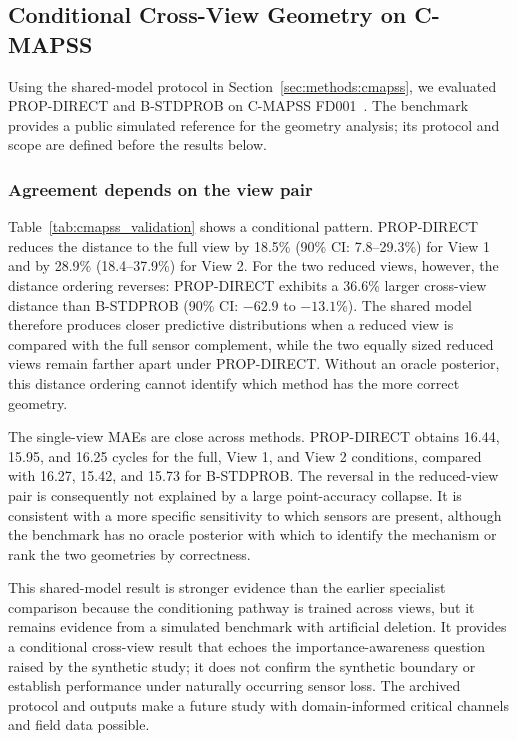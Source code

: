 \subsection{Conditional Cross-View Geometry on C-MAPSS}
\label{sec:results_cmapss}

Using the shared-model protocol in Section~\ref{sec:methods:cmapss}, we evaluated
PROP-DIRECT and B-STDPROB on C-MAPSS FD001~\citep{saxena2008cmapss}. The benchmark
provides a public simulated reference for the geometry analysis; its protocol and
scope are defined before the results below.

\subsubsection{Agreement depends on the view pair}

Table~\ref{tab:cmapss_validation} shows a conditional pattern. PROP-DIRECT reduces the distance to the full view by 18.5\% (90\% CI: 7.8--29.3\%) for View 1 and by 28.9\% (18.4--37.9\%) for View 2. For the two reduced views, however, the distance ordering reverses: PROP-DIRECT exhibits a 36.6\% larger cross-view distance than B-STDPROB (90\% CI: $-62.9$ to $-13.1$\%). The shared model therefore produces closer predictive distributions when a reduced view is compared with the full sensor complement, while the two equally sized reduced views remain farther apart under PROP-DIRECT. Without an oracle posterior, this distance ordering cannot identify which method has the more correct geometry.



The single-view MAEs are close across methods. PROP-DIRECT obtains 16.44, 15.95, and 16.25 cycles for the full, View 1, and View 2 conditions, compared with 16.27, 15.42, and 15.73 for B-STDPROB. The reversal in the reduced-view pair is consequently not explained by a large point-accuracy collapse. It is consistent with a more specific sensitivity to which sensors are present, although the benchmark has no oracle posterior with which to identify the mechanism or rank the two geometries by correctness.

This shared-model result is stronger evidence than the earlier specialist comparison because the conditioning pathway is trained across views, but it remains evidence from a simulated benchmark with artificial deletion. It provides a conditional cross-view result that echoes the importance-awareness question raised by the synthetic study; it does not confirm the synthetic boundary or establish performance under naturally occurring sensor loss. The archived protocol and outputs make a future study with domain-informed critical channels and field data possible.
